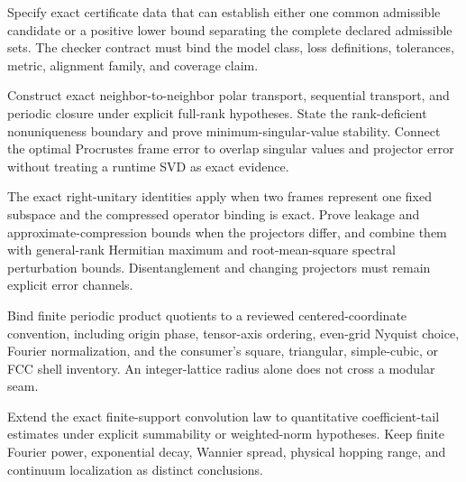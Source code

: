 \begin{openproblem}
Specify exact certificate data that can establish either one common admissible candidate
or a positive lower bound separating the complete declared admissible sets.  The checker
contract must bind the model class, loss definitions, tolerances, metric, alignment
family, and coverage claim.
\end{openproblem}

\begin{openproblem}
Construct exact neighbor-to-neighbor polar transport, sequential transport, and periodic
closure under explicit full-rank hypotheses.  State the rank-deficient nonuniqueness boundary and
prove minimum-singular-value stability.  Connect the optimal Procrustes frame error to overlap
singular values and projector error without treating a runtime SVD as exact evidence.
\end{openproblem}

\begin{openproblem}
The exact right-unitary identities apply when two frames represent one fixed subspace and the
compressed operator binding is exact.  Prove leakage and approximate-compression bounds when the
projectors differ, and combine them with general-rank Hermitian maximum and root-mean-square
spectral perturbation bounds.  Disentanglement and changing projectors must remain explicit error
channels.
\end{openproblem}

\begin{openproblem}
Bind finite periodic product quotients to a reviewed centered-coordinate convention, including
origin phase, tensor-axis ordering, even-grid Nyquist choice, Fourier normalization, and the
consumer's square, triangular, simple-cubic, or FCC shell inventory.  An integer-lattice radius
alone does not cross a modular seam.
\end{openproblem}

\begin{openproblem}
Extend the exact finite-support convolution law to quantitative coefficient-tail estimates under
explicit summability or weighted-norm hypotheses.  Keep finite Fourier power, exponential decay,
Wannier spread, physical hopping range, and continuum localization as distinct conclusions.
\end{openproblem}

